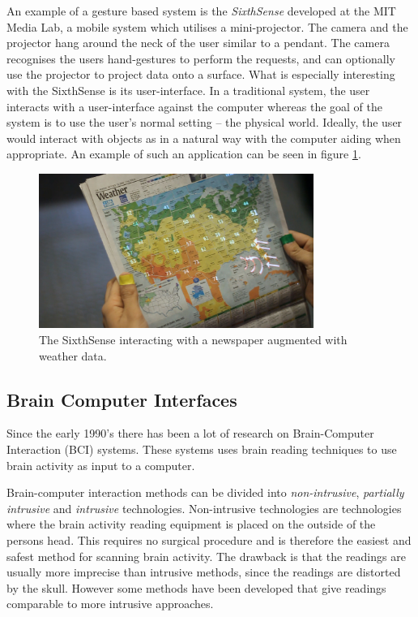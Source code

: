 An example of a gesture based system is the \emph{SixthSense} developed at the MIT Media Lab, a mobile system which utilises a mini-projector. The camera and the projector hang around the neck of the user similar to a pendant. The camera recognises the users hand-gestures to perform the requests, and can optionally use the projector to project data onto a surface. What is especially interesting with the SixthSense is its user-interface. In a traditional system, the user interacts with a user-interface against the computer whereas the goal of the system is to use the user's normal setting -- the physical world\cite{Mistry:2009:SWG:1667146.1667160}. Ideally, the user would interact with objects as in a natural way with the computer aiding when appropriate. An example of such an application can be seen in figure \ref{sixthsense}.


\begin{figure}[]
\includegraphics[width=0.8\textwidth] {bilder/newspaper.jpg}
\caption{The SixthSense interacting with a newspaper augmented with weather data.}
\label{sixthsense}
\end{figure}
\nocite{newspaper}


\subsection{Brain Computer Interfaces}

Since the early 1990's there has been a lot of research on Brain-Computer Interaction (BCI) systems. These systems uses brain reading techniques to use brain activity as input to a computer.

Brain-computer interaction methods can be divided into \emph{non-intrusive}, \emph{partially intrusive} and \emph{intrusive} technologies\cite{legobrain}. Non-intrusive technologies are technologies where the brain activity reading equipment is placed on the outside of the persons head. This requires no surgical procedure and is therefore the easiest and safest method for scanning brain activity. The drawback is that the readings are usually more imprecise than intrusive methods, since the readings are distorted by the skull. However some methods\cite{doud2011continuous} have been developed that give readings comparable to more intrusive approaches.

